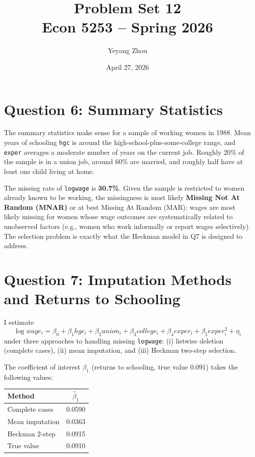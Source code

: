 \documentclass[12pt,english]{article}
\title{Problem Set 12\\ Econ 5253 -- Spring 2026}
\author{Yeyang Zhou}
\date{April 27, 2026}
\begin{document}
\maketitle

\section*{Question 6: Summary Statistics}



The summary statistics make sense for a sample of working women in 1988.
Mean years of schooling \texttt{hgc} is around the high-school-plus-some-college
range, and \texttt{exper} averages a moderate number of years on the
current job. Roughly 20\% of the sample is in a union job, around 60\%
are married, and roughly half have at least one child living at home.

The missing rate of \texttt{logwage} is \textbf{30.7\%}. Given the
sample is restricted to women already known to be working, the
missingness is most likely \textbf{Missing Not At Random (MNAR)} or at
best Missing At Random (MAR): wages are most likely missing for women
whose wage outcomes are systematically related to unobserved factors
(e.g., women who work informally or report wages selectively). The
selection problem is exactly what the Heckman model in Q7 is designed
to address.

\section*{Question 7: Imputation Methods and Returns to Schooling}

I estimate
\begin{equation}
\label{eq:wage}
\log wage_i = \beta_0 + \beta_1 hgc_i + \beta_2 union_i
            + \beta_3 college_i + \beta_4 exper_i
            + \beta_5 exper_i^2 + \eta_i
\end{equation}
under three approaches to handling missing \texttt{logwage}:
(i) listwise deletion (complete cases), (ii) mean imputation, and
(iii) Heckman two-step selection.



The coefficient of interest $\beta_1$ (returns to schooling, true value
0.091) takes the following values:

\begin{center}
\begin{tabular}{lc}
\toprule
Method & $\hat{\beta}_1$ \\
\midrule
Complete cases & 0.0590 \\
Mean imputation & 0.0363 \\
Heckman 2-step & 0.0915 \\
\midrule
True value & 0.0910 \\
\bottomrule
\end{tabular}
\end{center}
\end{document}
